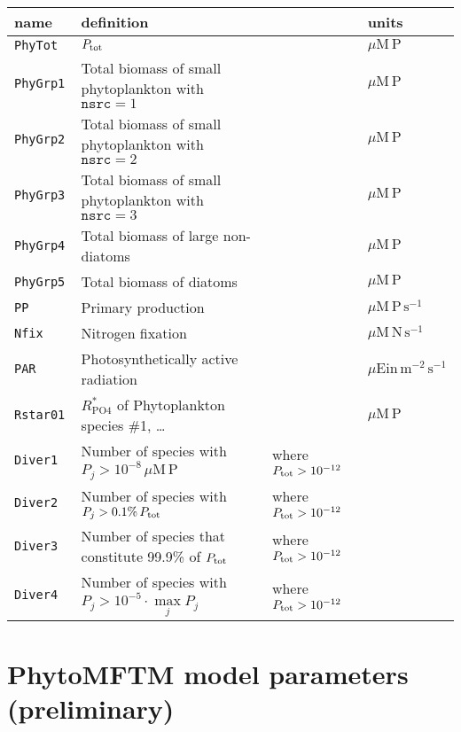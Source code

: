 \documentclass[11pt,letterpaper,english]{article}
\begin{document}
\begin{tabular}{llll}
 name & definition && units \\
\hline
 \texttt{PhyTot  } & $P_{\mathrm{tot}}$                                                        && $\mu\mathrm{M\,P}$ \\
 \texttt{PhyGrp1 } & Total biomass of small phytoplankton with $\texttt{nsrc}=1$    && $\mu\mathrm{M\,P}$ \\
 \texttt{PhyGrp2 } & Total biomass of small phytoplankton with $\texttt{nsrc}=2$    && $\mu\mathrm{M\,P}$ \\
 \texttt{PhyGrp3 } & Total biomass of small phytoplankton with $\texttt{nsrc}=3$    && $\mu\mathrm{M\,P}$ \\
 \texttt{PhyGrp4 } & Total biomass of large non-diatoms                             && $\mu\mathrm{M\,P}$ \\
 \texttt{PhyGrp5 } & Total biomass of diatoms                                       && $\mu\mathrm{M\,P}$ \\
 \texttt{PP      } & Primary production                                             && $\mu\mathrm{M\,P}\, \mathrm{s}^{-1}$ \\
 \texttt{Nfix    } & Nitrogen fixation                                              && $\mu\mathrm{M\,N}\, \mathrm{s}^{-1}$ \\
 \texttt{PAR     } & Photosynthetically active radiation                            && $\mu\mathrm{Ein}\, \mathrm{m}^{-2}\,\mathrm{s}^{-1}$ \\
 \texttt{Rstar01 } & $R^*_{\mathrm{PO4}}$ of Phytoplankton species \#1, \dots       && $\mu\mathrm{M\,P}$ \\
 \texttt{Diver1  } & Number of species with $P_j > 10^{-8}\,\mu\mathrm{M\,P}$       & where $P_{\mathrm{tot}}>10^{-12}$ \\
 \texttt{Diver2  } & Number of species with $P_j > 0.1\%\,  P_{\mathrm{tot}}$                  & where $P_{\mathrm{tot}}>10^{-12}$ \\
 \texttt{Diver3  } & Number of species that constitute 99.9\% of $P_{\mathrm{tot}}$            & where $P_{\mathrm{tot}}>10^{-12}$ \\
 \texttt{Diver4  } & Number of species with $P_j > 10^{-5} \cdot \max\limits_j P_j$ & where $P_{\mathrm{tot}}>10^{-12}$ \\
\end{tabular}





\thispagestyle{empty}

\section*{PhytoMFTM model parameters (preliminary)}
\end{document}
